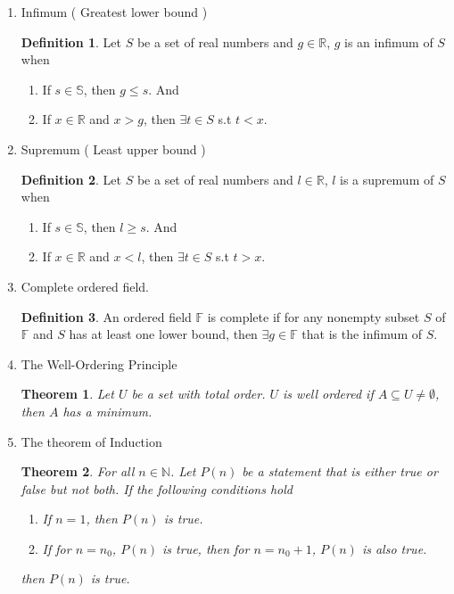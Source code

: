 \documentclass{article}
\theoremstyle{claim}
\newtheorem{theorem}{Theorem}[section]
\theoremstyle{definition}
\newtheorem{definition}{Definition}
\begin{document}
\begin{enumerate}
    \item[18.] Infimum ( Greatest lower bound )
        \begin{definition}
            Let $S$ be a set of real numbers and $g \in \mathbb{R}$, $g$ is an infimum of $S$ when
            \begin{enumerate}
                \item[1.] If $s \in \mathbb{S}$, then $g \le s$. And
                \item[2.] If $x \in \mathbb{R}$ and $x > g$, then $\exists t \in S$ s.t $t < x$.
            \end{enumerate}
        \end{definition}
    \item[19.] Supremum ( Least upper bound )
        \begin{definition}
            Let $S$ be a set of real numbers and $l \in \mathbb{R}$, $l$ is a supremum of $S$ when
            \begin{enumerate}
                \item[1.] If $s \in \mathbb{S}$, then $l \ge s$. And
                \item[2.] If $x \in \mathbb{R}$ and $x < l$, then $\exists t \in S$ s.t $t > x$.
            \end{enumerate}
        \end{definition}

    \item[20.] Complete ordered field.
        \begin{definition}
            An ordered field $\mathbb{F}$ is complete if for any nonempty subset $S$ of $\mathbb{F}$ and $S$ has at least one lower bound, then $\exists g \in \mathbb{F}$ that is the infimum of $S$.
        \end{definition}
    
    \item[21.] The Well-Ordering Principle
        \begin{theorem}
            Let $U$ be a set with total order. $U$ is well ordered if $A \subseteq U \ne \emptyset$, then $A$ has a minimum.
        \end{theorem}

    \item[22.] The theorem of Induction
        \begin{theorem}
            For all $n \in \mathbb{N}$. Let $P(n)$ be a statement that is either true or false but not both. If the following conditions hold
            \begin{enumerate}
                \item[1.] If $n = 1$, then $P(n)$ is true.
                \item[2.] If for $n = n_0$, $P(n)$ is true, then for $n = n_0 + 1$, $P(n)$ is also true.
            \end{enumerate}
            then $P(n)$ is true.
        \end{theorem}


\end{enumerate}
\end{document}
